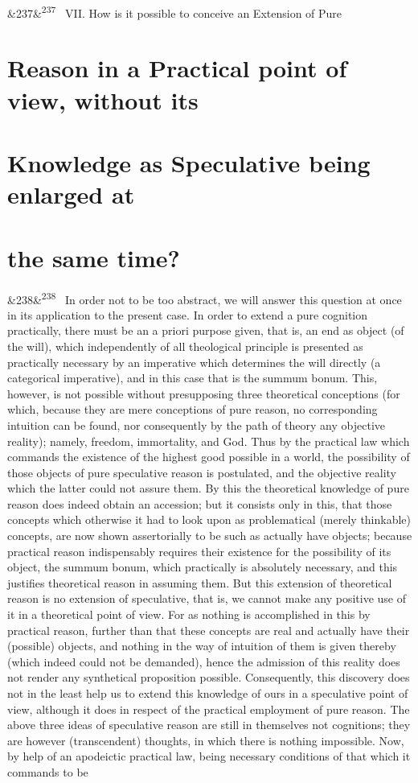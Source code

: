 \documentclass[12pt]{article}
\newcommand{\para}[1][]{\par\noindent\ifx&#1&\else\textsuperscript{\footnotesize #1}~\fi}
\begin{document}
\para[237] VII. How is it possible to conceive an Extension of Pure

\section*{Reason in a Practical point of view, without its}

\section*{Knowledge as Speculative being enlarged at}

\section*{the same time?}

\para[238] In order not to be too abstract, we will answer this question at once in its application to the present case. In order to extend a pure cognition practically, there must be an a priori purpose given, that is, an end as object (of the will), which independently of all theological principle is presented as practically necessary by an imperative which determines the will directly (a categorical imperative), and in this case that is the summum bonum. This, however, is not possible without presupposing three theoretical conceptions (for which, because they are mere conceptions of pure reason, no corresponding intuition can be found, nor consequently by the path of theory any objective reality); namely, freedom, immortality, and God. Thus by the practical law which commands the existence of the highest good possible in a world, the possibility of those objects of pure speculative reason is postulated, and the objective reality which the latter could not assure them. By this the theoretical knowledge of pure reason does indeed obtain an accession; but it consists only in this, that those concepts which otherwise it had to look upon as problematical (merely thinkable) concepts, are now shown assertorially to be such as actually have objects; because practical reason indispensably requires their existence for the possibility of its object, the summum bonum, which practically is absolutely necessary, and this justifies theoretical reason in assuming them. But this extension of theoretical reason is no extension of speculative, that is, we cannot make any positive use of it in a theoretical point of view. For as nothing is accomplished in this by practical reason, further than that these concepts are real and actually have their (possible) objects, and nothing in the way of intuition of them is given thereby (which indeed could not be demanded), hence the admission of this reality does not render any synthetical proposition possible. Consequently, this discovery does not in the least help us to extend this knowledge of ours in a speculative point of view, although it does in respect of the practical employment of pure reason. The above three ideas of speculative reason are still in themselves not cognitions; they are however (transcendent) thoughts, in which there is nothing impossible. Now, by help of an apodeictic practical law, being necessary conditions of that which it commands to be 
\end{document}
